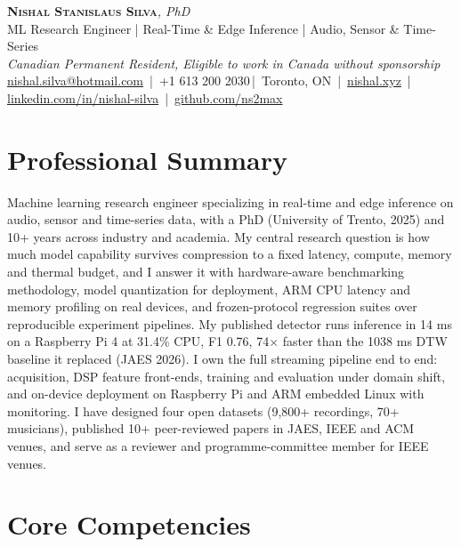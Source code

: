 \documentclass[11pt]{article}
\makeatletter
\newcommand{\cvName}{Nishal Stanislaus Silva}
\newcommand{\cvEmail}{nishal.silva@hotmail.com}
\newcommand{\cvPhone}{+1 613 200 2030}
\newcommand{\cvCity}{Toronto, ON}
\newcommand{\cvSite}{https://nishal.xyz}
\newcommand{\cvLinkedIn}{https://www.linkedin.com/in/nishal-silva}
\newcommand{\cvGitHub}{https://github.com/ns2max}
\newcommand{\cvStatus}{Canadian Permanent Resident, Eligible to work in Canada without sponsorship}
\newcommand{\cvTagline}{ML Research Engineer | Real-Time \& Edge Inference | Audio, Sensor \& Time-Series}
\makeatother
\begin{document}
\pagestyle{empty}
\begin{center}
    {\LARGE \scshape \textbf{\cvName}}{\large \textit{, PhD}}\\[1pt]
    {\small \cvTagline}\\[1pt]
    {\footnotesize\textit{\cvStatus}}\\[1pt]
    {\small
    \href{mailto:\cvEmail}{\cvEmail} \,|\, \cvPhone \,|\, \cvCity
    \,|\, \href{\cvSite}{nishal.xyz} \,|\, \href{\cvLinkedIn}{linkedin.com/in/nishal-silva}
    \,|\, \href{\cvGitHub}{github.com/ns2max}}
\end{center}

\section*{Professional Summary}

Machine learning research engineer specializing in real-time and edge inference on audio, sensor and time-series data, with a PhD (University of Trento, 2025) and 10+ years across industry and academia. My central research question is how much model capability survives compression to a fixed latency, compute, memory and thermal budget, and I answer it with hardware-aware benchmarking methodology, model quantization for deployment, ARM CPU latency and memory profiling on real devices, and frozen-protocol regression suites over reproducible experiment pipelines. My published detector runs inference in 14 ms on a Raspberry Pi 4 at 31.4\% CPU, F1 0.76, 74$\times$ faster than the 1038 ms DTW baseline it replaced (JAES 2026). I own the full streaming pipeline end to end: acquisition, DSP feature front-ends, training and evaluation under domain shift, and on-device deployment on Raspberry Pi and ARM embedded Linux with monitoring. I have designed four open datasets (9,800+ recordings, 70+ musicians), published 10+ peer-reviewed papers in JAES, IEEE and ACM venues, and serve as a reviewer and programme-committee member for IEEE venues.

\section*{Core Competencies}
\end{document}
